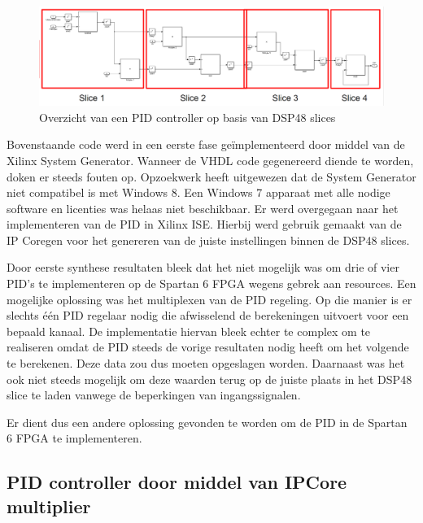 				\begin{figure}[H]					  
					  \centering
					  \includegraphics[width=\textwidth]{Implementatie/pid_dsp48.png}
					  \caption{Overzicht van een PID controller op basis van DSP48 slices}
					  \label{pid_dsp48}
				\end{figure}

			\par Bovenstaande code werd in een eerste fase ge\"implementeerd door middel van de Xilinx System Generator. Wanneer de VHDL code gegenereerd diende te worden, doken er steeds fouten op. Opzoekwerk heeft uitgewezen dat de System Generator niet compatibel is met Windows 8. Een Windows 7 apparaat met alle nodige software en licenties was helaas niet beschikbaar. Er werd overgegaan naar het implementeren van de PID in Xilinx ISE. Hierbij werd gebruik gemaakt van de IP Coregen voor het genereren van de juiste instellingen binnen de DSP48 slices.

			\par Door eerste synthese resultaten bleek dat het niet mogelijk was om drie of vier PID's te implementeren op de Spartan 6 FPGA wegens gebrek aan resources. Een mogelijke oplossing was het multiplexen van de PID regeling. Op die manier is er slechts \'e\'en PID regelaar nodig die afwisselend de berekeningen uitvoert voor een bepaald kanaal. De implementatie hiervan bleek echter te complex om te realiseren omdat de PID steeds de vorige resultaten nodig heeft om het volgende te berekenen. Deze data zou dus moeten opgeslagen worden. Daarnaast was het ook niet steeds mogelijk om deze waarden terug op de juiste plaats in het DSP48 slice te laden vanwege de beperkingen van ingangssignalen.

			\par Er dient dus een andere oplossing gevonden te worden om de PID in de Spartan 6 FPGA te implementeren.

		\subsection{PID controller door middel van IPCore multiplier}
		\label{pid_mult}


